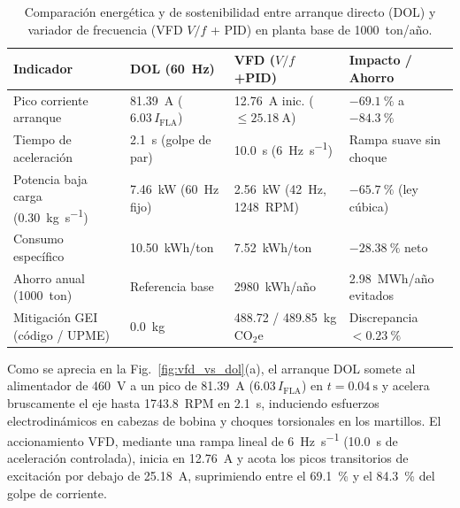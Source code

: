 \begin{table}[!t]
\begingroup
\setlength{\tabcolsep}{2.8pt}
\renewcommand{\arraystretch}{1.04}
\centering\footnotesize
\caption{Comparación energética y de sostenibilidad entre arranque directo (DOL) y variador de frecuencia (VFD $V/f$ + PID) en planta base de \qty{1000}{ton}/año.}
\label{tab:energia_sostenibilidad}
\begin{tabularx}{\columnwidth}{@{} >{\raggedright\arraybackslash}p{2.20cm} >{\raggedright\arraybackslash}p{2.00cm} >{\raggedright\arraybackslash}p{2.05cm} >{\raggedright\arraybackslash}X @{}}
\toprule
\textbf{Indicador} & \textbf{DOL (\qty{60}{\hertz})} & \textbf{VFD ($V/f$+PID)} & \textbf{Impacto / Ahorro} \\
\midrule
Pico corriente arranque & \qty{81.39}{\ampere} ($6.03\,I_{\text{FLA}}$) & \qty{12.76}{\ampere} inic. ($\le\qty{25.18}{\ampere}$) & $-\qty{69.1}{\percent}$ a $-\qty{84.3}{\percent}$ \\
Tiempo de aceleración & \qty{2.1}{\second} (golpe de par) & \qty{10.0}{\second} (\qty{6}{\hertz\per\second}) & Rampa suave sin choque \\
Potencia baja carga (\qty{0.30}{\kilogram\per\second}) & \qty{7.46}{\kilo\watt} (\qty{60}{\hertz} fijo) & \qty{2.56}{\kilo\watt} (\qty{42}{\hertz}, \qty{1248}{RPM}) & $-\qty{65.7}{\percent}$ (ley cúbica) \\
Consumo específico & \qty{10.50}{kWh/ton} & \qty{7.52}{kWh/ton} & $-\qty{28.38}{\percent}$ neto \\
Ahorro anual (\qty{1000}{ton}) & Referencia base & \qty{2980}{kWh}/año & \qty{2.98}{MWh}/año evitados \\
Mitigación GEI (código / UPME) & \qty{0.0}{\kilogram} & \num{488.72} / \qty{489.85}{\kilogram} $\text{CO}_2\text{e}$ & Discrepancia $<\qty{0.23}{\percent}$~\cite{UPME2024} \\
\bottomrule
\end{tabularx}
\endgroup
\end{table}

Como se aprecia en la Fig.~\ref{fig:vfd_vs_dol}(a), el arranque DOL somete al alimentador de \qty{460}{\volt} a un pico de \qty{81.39}{\ampere} ($6.03\,I_{\text{FLA}}$) en $t=\qty{0.04}{\second}$ y acelera bruscamente el eje hasta \qty{1743.8}{RPM} en \qty{2.1}{\second}, induciendo esfuerzos electrodinámicos en cabezas de bobina y choques torsionales en los martillos. El accionamiento VFD, mediante una rampa lineal de \qty{6}{\hertz\per\second} (\qty{10.0}{\second} de aceleración controlada), inicia en \qty{12.76}{\ampere} y acota los picos transitorios de excitación por debajo de \qty{25.18}{\ampere}, suprimiendo entre el \qty{69.1}{\percent} y el \qty{84.3}{\percent} del golpe de corriente.

